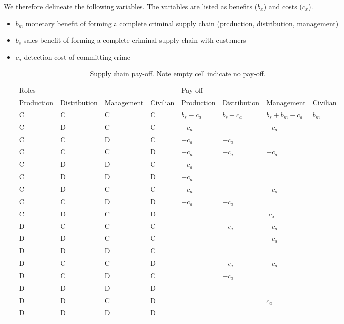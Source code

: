 \documentclass[a4paper, 11pt, twocolumn]{article}
\begin{document}
We   therefore  delineate   the  following   variables.  The
variables are listed as benefits (\(b_x\)) and costs (\(c_x\)).
\begin{itemize}
\item \(b_m\)  monetary benefit  of  forming  a complete  criminal
supply chain (production, distribution, management)
\item \(b_s\) sales benefit of  forming a complete criminal supply
chain with customers
\item \(c_a\) detection cost of committing crime

\begin{table*}[htbp]
\caption{\label{table:payoff}Supply chain pay-off. Note empty cell indicate no pay-off.}
\centering
\begin{tabular}{llllllll}
Roles &  &  &  & Pay-off &  &  & \\[0pt]
Production & Distribution & Management & Civilian & Production & Distribution & Management & Civilian\\[0pt]
\hline
C & C & C & C & \(b_s -c_a\) & \(b_s -c_a\) & \(b_s + b_m - c_a\) & \(b_m\)\\[0pt]
C & D & C & C & \(-c_a\) &  & \(-c_a\) & \\[0pt]
C & C & D & C & \(-c_a\) & \(-c_a\) &  & \\[0pt]
C & C & C & D & \(-c_a\) & \(-c_a\) & \(-c_a\) & \\[0pt]
C & D & D & C & \(-c_a\) &  &  & \\[0pt]
C & D & D & D & \(-c_a\) &  &  & \\[0pt]
C & D & C & C & \(-c_a\) &  & \(-c_s\) & \\[0pt]
C & C & D & D & \(-c_a\) & \(-c_a\) &  & \\[0pt]
C & D & C & D &  &  & -\(c_a\) & \\[0pt]
D & C & C & C &  & \(-c_a\) & \(-c_a\) & \\[0pt]
D & D & C & C &  &  & \(-c_a\) & \\[0pt]
D & D & D & C &  &  &  & \\[0pt]
D & C & C & D &  & \(-c_a\) & \(-c_a\) & \\[0pt]
D & C & D & C &  & \(-c_a\) &  & \\[0pt]
D & D & D & D &  &  &  & \\[0pt]
D & D & C & D &  &  & \(c_a\) & \\[0pt]
D & D & D & D &  &  &  & \\[0pt]
\end{tabular}
\end{table*}
\end{itemize}
\end{document}
